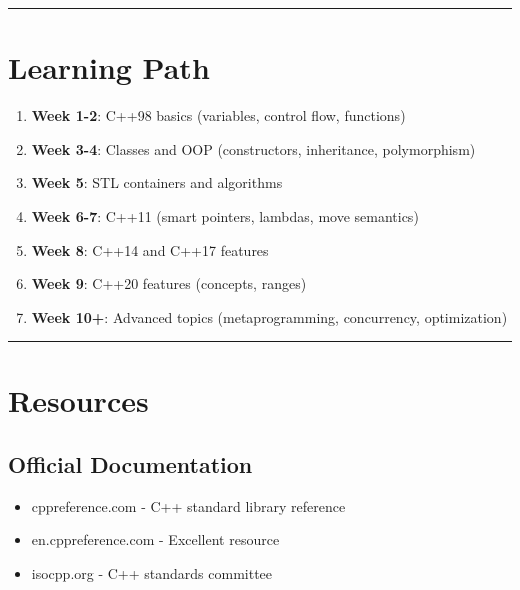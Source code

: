 \begin{center}\rule{0.5\linewidth}{0.5pt}\end{center}

\hypertarget{learning-path}{%
\section{Learning Path}\label{learning-path}}

\begin{enumerate}
\def\labelenumi{\arabic{enumi}.}
\tightlist
\item
  \textbf{Week 1-2}: C++98 basics (variables, control flow, functions)
\item
  \textbf{Week 3-4}: Classes and OOP (constructors, inheritance,
  polymorphism)
\item
  \textbf{Week 5}: STL containers and algorithms
\item
  \textbf{Week 6-7}: C++11 (smart pointers, lambdas, move semantics)
\item
  \textbf{Week 8}: C++14 and C++17 features
\item
  \textbf{Week 9}: C++20 features (concepts, ranges)
\item
  \textbf{Week 10+}: Advanced topics (metaprogramming, concurrency,
  optimization)
\end{enumerate}

\begin{center}\rule{0.5\linewidth}{0.5pt}\end{center}

\hypertarget{resources}{%
\section{Resources}\label{resources}}

\hypertarget{official-documentation}{%
\subsection{Official Documentation}\label{official-documentation}}

\begin{itemize}
\tightlist
\item
  cppreference.com - C++ standard library reference
\item
  en.cppreference.com - Excellent resource
\item
  isocpp.org - C++ standards committee
\end{itemize}

